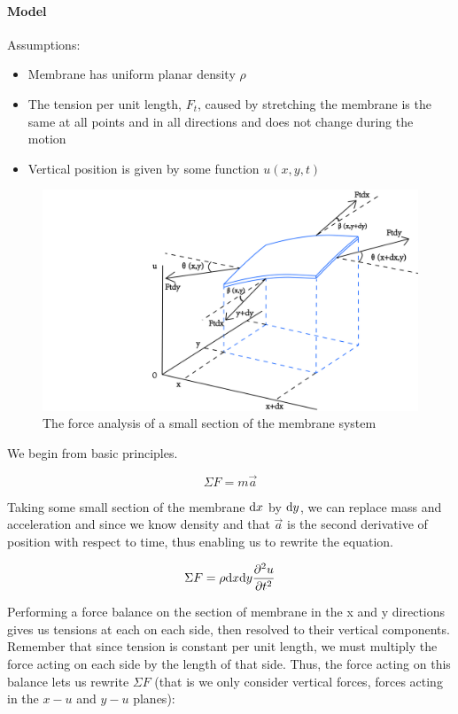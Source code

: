 \paragraph{Model}
Assumptions:
\begin{itemize}
	\item Membrane has uniform planar density $\rho$
    \item The tension per unit length, $F_t$, caused by stretching the membrane is the same at all points and in all directions and does not change during the motion
    \item Vertical position is given by some function $u(x,y,t)$
\end{itemize}
\begin{figure}[htb]
	\centering
	\includegraphics[width=15cm]{Figures/2D_waves_model.png}       
	\caption{The force analysis of a small section of the membrane system }
	\label{2D_waves_model.fig}
\end{figure}
We begin from basic principles.

$$\Sigma F = m\vec{a}$$

\noindent Taking some small section of the membrane $\mathrm d x$ by $\mathrm d y$, we can replace mass and acceleration and since we know density and that $\vec{a}$ is the second derivative of position with respect to time, thus enabling us to rewrite the equation.

\begin{equation}
\label{no_balance}
\Sigma F = \rho \mathrm d x\mathrm d y \frac{\partial^2u}{\partial t^2}
\end{equation}

\noindent Performing a force balance on the section of membrane in the x and y directions gives us tensions at each on each side, then resolved to their vertical components. Remember that since tension is constant per unit length, we must multiply the force acting on each side by the length of that side. Thus, the force acting on this balance lets us rewrite $\Sigma F$ (that is we only consider vertical forces, forces acting in the $x-u$ and $y-u$ planes): 

